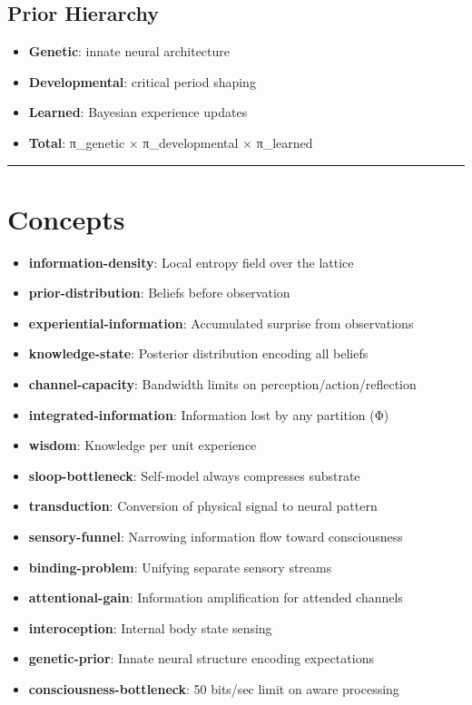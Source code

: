 \documentclass[
  11pt,
  letterpaper,
  twoside,
  openright]{book}
\providecommand{\tightlist}{%
  \setlength{\itemsep}{0pt}\setlength{\parskip}{0pt}}
\begin{document}
\subsection{Prior Hierarchy}\label{prior-hierarchy}

\begin{itemize}
\tightlist
\item
  \textbf{Genetic}: innate neural architecture
\item
  \textbf{Developmental}: critical period shaping
\item
  \textbf{Learned}: Bayesian experience updates
\item
  \textbf{Total}: π\_genetic × π\_developmental × π\_learned
\end{itemize}

\begin{center}\rule{0.5\linewidth}{0.5pt}\end{center}

\section{Concepts}\label{concepts-46}

\begin{itemize}
\tightlist
\item
  \textbf{information-density}: Local entropy field over the lattice
\item
  \textbf{prior-distribution}: Beliefs before observation
\item
  \textbf{experiential-information}: Accumulated surprise from
  observations
\item
  \textbf{knowledge-state}: Posterior distribution encoding all beliefs
\item
  \textbf{channel-capacity}: Bandwidth limits on
  perception/action/reflection
\item
  \textbf{integrated-information}: Information lost by any partition (Φ)
\item
  \textbf{wisdom}: Knowledge per unit experience
\item
  \textbf{sloop-bottleneck}: Self-model always compresses substrate
\item
  \textbf{transduction}: Conversion of physical signal to neural pattern
\item
  \textbf{sensory-funnel}: Narrowing information flow toward
  consciousness
\item
  \textbf{binding-problem}: Unifying separate sensory streams
\item
  \textbf{attentional-gain}: Information amplification for attended
  channels
\item
  \textbf{interoception}: Internal body state sensing
\item
  \textbf{genetic-prior}: Innate neural structure encoding expectations
\item
  \textbf{consciousness-bottleneck}: 50 bits/sec limit on aware
  processing
\end{itemize}
\end{document}
